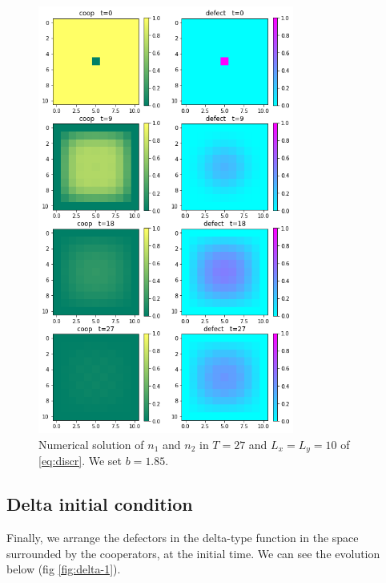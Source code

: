 \begin{figure}
\includegraphics[width=0.75\textwidth]{immagini/discr-onedef}

\caption{\label{fig:onedef-1}Numerical solution of $n_{1}$ and $n_{2}$ in
$T=27$ and $L_{x}=L_{y}=10$ of \ref{eq:discr}. We set $b=1.85$.}
\end{figure}


\subsection{Delta initial condition}

Finally, we arrange the defectors in the delta-type function in the
space surrounded by the cooperators, at the initial time. We can see
the evolution below (fig \ref{fig:delta-1}). 

